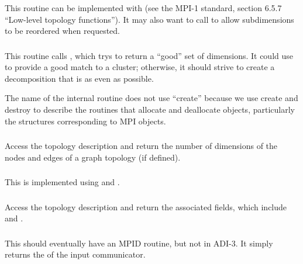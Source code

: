 \documentclass{article}
\begin{document}
\subsubsection{}
This routine can be implemented with  (see the MPI-1
standard, section 6.5.7 ``Low-level topology functions'').  It may also
want to call  to allow subdimensions to be reordered
when requested.

\subsubsection{}
This routine calls , which trys to return a
``good'' set of dimensions.  It could use  to
provide a good match to a cluster; otherwise, it should strive to create a
decomposition that is as even as possible.

The name of the internal routine does not use ``create'' because we use
create and destroy to describe the routines that allocate and deallocate
objects, particularly the structures corresponding to MPI objects.  

\subsubsection{}
Access the topology description and return the number of dimensions of
the nodes and edges of a graph topology (if defined).

\subsubsection{}
This is implemented using  and
. 

\subsubsection{}
Access the topology description and return the associated fields, which
include  and
. 

\subsubsection{}
This should eventually have an MPID routine, but not in ADI-3.  It simply
returns the  of the input communicator.
\end{document}
